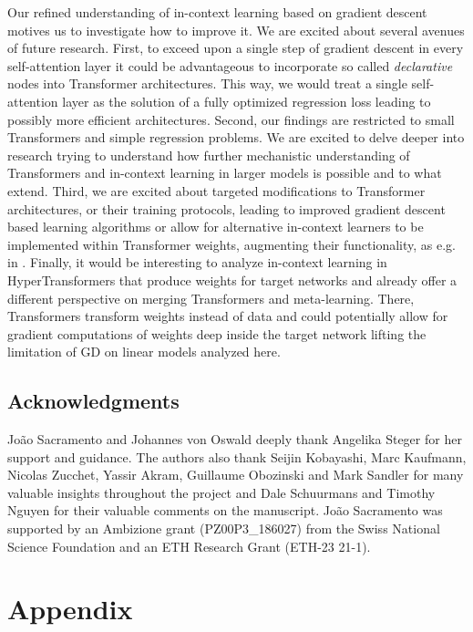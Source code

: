 \documentclass{article}
\theoremstyle{plain}
\theoremstyle{definition}
\theoremstyle{remark}
\begin{document}
Our refined understanding of in-context learning based on gradient descent motives us to investigate how to improve it. We are excited about several avenues of future research. 
First, to exceed upon a single step of gradient descent in every self-attention layer it could be advantageous to incorporate so called  \textit{declarative} nodes \citep{amos_optnet_2017,bai_deep_2019,gould_deep_2021,zucchet_beyond_2022} into Transformer architectures. This way, we would treat a single self-attention layer as the solution of a fully optimized regression loss leading to possibly more efficient architectures.
Second, our findings are restricted to small Transformers and simple regression problems. We are excited to delve deeper into research trying to understand how further mechanistic understanding of Transformers and in-context learning in larger models is possible and to what extend.
Third, we are excited about targeted modifications to Transformer architectures, or their training protocols, leading to improved gradient descent based learning algorithms or allow for alternative in-context learners to be implemented within Transformer weights, augmenting their functionality, as e.g. in \citet{dai2023why}.
Finally, it would be interesting to analyze in-context learning in HyperTransformers \citep{hypertransformer} that produce weights for target networks and already offer a different perspective on merging Transformers and meta-learning. There, Transformers transform weights instead of data and could potentially allow for gradient computations of weights deep inside the target network lifting the limitation of GD on linear models analyzed here.

\subsection*{Acknowledgments}
João Sacramento and Johannes von Oswald deeply thank Angelika Steger for her support and guidance. The authors also thank Seijin Kobayashi, Marc Kaufmann, Nicolas Zucchet, Yassir Akram, Guillaume Obozinski and Mark Sandler for many valuable insights throughout the project and Dale Schuurmans and Timothy Nguyen for their valuable comments on the manuscript. João Sacramento was supported by an Ambizione grant (PZ00P3\_186027) from the Swiss National Science Foundation and an ETH Research Grant (ETH-23 21-1). 

\newpage



\newpage
\appendix
\onecolumn
\section{Appendix}
\label{app:main}
\end{document}
